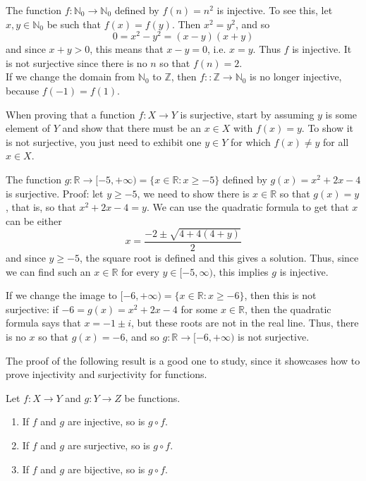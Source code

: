 \documentclass[11pt,dvipsnames]{book}
\numberwithin{equation}{section} %
\numberwithin{figure}{section} %
\numberwithin{table}{section} %
\begin{document}
\begin{example}
The function $f\colon\mathbb{N}_0\rightarrow \mathbb{N}_0$ defined by $f(n)=n^2$ is injective. To see this, let $x,y\in\mathbb{N}_0$ be such that $f(x)=f(y)$. Then $x^2=y^2$, and so
\[
0=x^2-y^2=(x-y)(x+y)
\]
and since $x+y>0$, this means that $x-y=0$, i.e. $x=y$. Thus $f$ is injective. It is not surjective since there is no $n$ so that $f(n)=2$. \\

If we change the domain from $\mathbb{N}_0$ to $\mathbb{Z}$, then $f:\colon\mathbb{Z}\rightarrow \mathbb{N}_0$ is no longer injective, because $f(-1)=f(1)$. 
\end{example}

\begin{protip}
When proving that a function $f\colon X\rightarrow Y$ is surjective, start by assuming $y$ is some element of $Y$ and show that there must be an $x\in X$ with $f(x)=y$. To show it is not surjective, you just need to exhibit one $y\in Y$ for which $f(x)\neq y$ for all $x\in X$.
\end{protip}

\begin{example}
The function $g\colon\mathbb{R}\rightarrow [-5,+\infty)=\{x\in\mathbb{R}: x\geq -5\} $ defined by $g(x)=x^2+2x-4$ is surjective. Proof: let $y\geq -5$, we need to show there is $x\in\mathbb{R}$ so that $g(x)=y$, that is, so that $x^2+2x-4=y$. We can use the quadratic formula to get that $x$ can be either
\[
x=\frac{-2\pm \sqrt{4+4(4+y)}}{2}
\]
and since $y\geq -5$, the square root is defined and this gives a solution. Thus, since we can find such an $x\in \mathbb{R}$ for every $y\in [-5,\infty)$, this implies $g$ is injective. 

If we change the image to $[-6,+\infty)=\{x\in\mathbb{R} : x\geq -6\}$, then this is not surjective: if $-6=g(x)=x^2+2x-4$ for some $x\in\mathbb{R}$, then the quadratic formula says that $x=-1\pm i$, but these roots are not in the real line. Thus, there is no $x$ so that $g(x)=-6$, and so $g\colon \mathbb{R}\rightarrow [-6,+\infty)$ is not surjective.
\end{example}



The proof of the following result is a good one to study, since it showcases how to prove injectivity and surjectivity for functions. 

\begin{theorem}
Let $f:X\rightarrow Y$ and $g:Y\rightarrow Z$ be functions. 
\begin{enumerate}
\item If $f$ and $g$ are injective, so is $g\circ f$. 
\item If $f$ and $g$ are surjective, so is $g\circ f$.
\item If $f$ and $g$ are bijective, so is $g\circ f$.
\end{enumerate}
\end{theorem}
\end{document}
